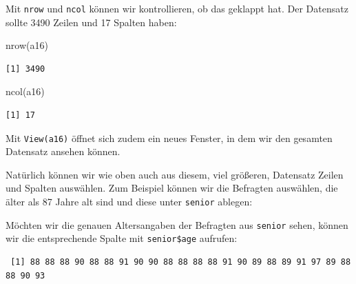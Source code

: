 \documentclass[
  letterpaper,
  DIV=11,
  numbers=noendperiod]{scrreprt}
\newenvironment{Shaded}{\begin{snugshade}}{\end{snugshade}}
\newcommand{\DecValTok}[1]{\textcolor[rgb]{0.68,0.00,0.00}{#1}}
\newcommand{\FunctionTok}[1]{\textcolor[rgb]{0.28,0.35,0.67}{#1}}
\newcommand{\NormalTok}[1]{\textcolor[rgb]{0.00,0.46,0.62}{#1}}
\newcommand{\OtherTok}[1]{\textcolor[rgb]{0.00,0.46,0.62}{#1}}
\newcommand{\SpecialCharTok}[1]{\textcolor[rgb]{0.37,0.37,0.37}{#1}}
\begin{document}
Mit \texttt{nrow} und \texttt{ncol} können wir kontrollieren, ob das
geklappt hat. Der Datensatz sollte 3490 Zeilen und 17 Spalten haben:

\begin{Shaded}
\begin{Highlighting}[]
\FunctionTok{nrow}\NormalTok{(a16)}
\end{Highlighting}
\end{Shaded}

\begin{verbatim}
[1] 3490
\end{verbatim}

\begin{Shaded}
\begin{Highlighting}[]
\FunctionTok{ncol}\NormalTok{(a16)}
\end{Highlighting}
\end{Shaded}

\begin{verbatim}
[1] 17
\end{verbatim}

Mit \texttt{View(a16)} öffnet sich zudem ein neues Fenster, in dem wir
den gesamten Datensatz ansehen können.

Natürlich können wir wie oben auch aus diesem, viel größeren, Datensatz
Zeilen und Spalten auswählen. Zum Beispiel können wir die Befragten
auswählen, die älter als 87 Jahre alt sind und diese unter
\texttt{senior} ablegen:

\begin{Shaded}
\end{Shaded}

Möchten wir die genauen Altersangaben der Befragten aus \texttt{senior}
sehen, können wir die entsprechende Spalte mit \texttt{senior\$age}
aufrufen:

\begin{Shaded}
\end{Shaded}

\begin{verbatim}
 [1] 88 88 88 90 88 88 91 90 90 88 88 88 88 91 90 89 88 89 91 97 89 88 88 90 93
\end{verbatim}
\end{document}
